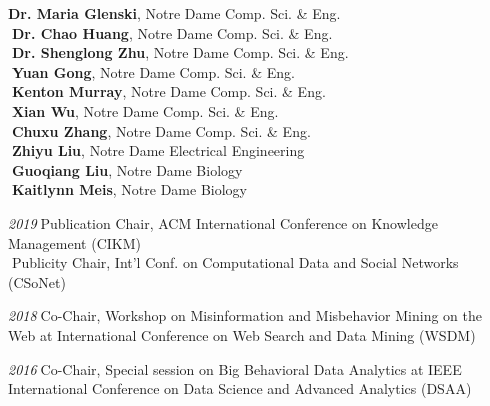 \documentclass[10pt]{article}
\newenvironment{myindentpar}[1]%
{\begin{list}{}%
         {\setlength{\leftmargin}{#1}}%
         \item[]%
}
{\end{list}}
\newcounter{list}
\begin{document}
\begin{myindentpar}{0.75cm}

\hspace{-0.75cm}{\bf Ph.D. Thesis Committee}

{\small

\textcolor{white}{} {\bf Dr. Maria Glenski}, Notre Dame Comp. Sci. \& Eng. \\
\textcolor{white}{.}{\bf Dr. Chao Huang}, Notre Dame Comp. Sci. \& Eng. \\
\textcolor{white}{.}{\bf Dr. Shenglong Zhu}, Notre Dame Comp. Sci. \& Eng. \\
\textcolor{white}{.}{\bf Yuan Gong}, Notre Dame Comp. Sci. \& Eng. \\
\textcolor{white}{.}{\bf Kenton Murray}, Notre Dame Comp. Sci. \& Eng. \\
\textcolor{white}{.}{\bf Xian Wu}, Notre Dame Comp. Sci. \& Eng. \\
\textcolor{white}{.}{\bf Chuxu Zhang}, Notre Dame Comp. Sci. \& Eng. \\
\textcolor{white}{.}{\bf Zhiyu Liu}, Notre Dame Electrical Engineering \\
\textcolor{white}{.}{\bf Guoqiang Liu}, Notre Dame Biology \\
\textcolor{white}{.}{\bf Kaitlynn Meis}, Notre Dame Biology

}


\hspace{-0.75cm}{\bf Organizing Committee}

{\small

\hspace{-0.75cm}\emph{2019}\textcolor{white}{.}Publication Chair, ACM International Conference on Knowledge Management (CIKM) \\
\textcolor{white}{.}Publicity Chair, Int'l Conf. on Computational Data and Social Networks (CSoNet)

\hspace{-0.75cm}\emph{2018}\textcolor{white}{.}Co-Chair, Workshop on Misinformation and Misbehavior Mining on the Web at International Conference on Web Search and Data Mining (WSDM)

\hspace{-0.75cm}\emph{2016}\textcolor{white}{.}Co-Chair, Special session on Big Behavioral Data Analytics at IEEE International Conference on Data Science and Advanced Analytics (DSAA)

}
\end{myindentpar}
\end{document}
